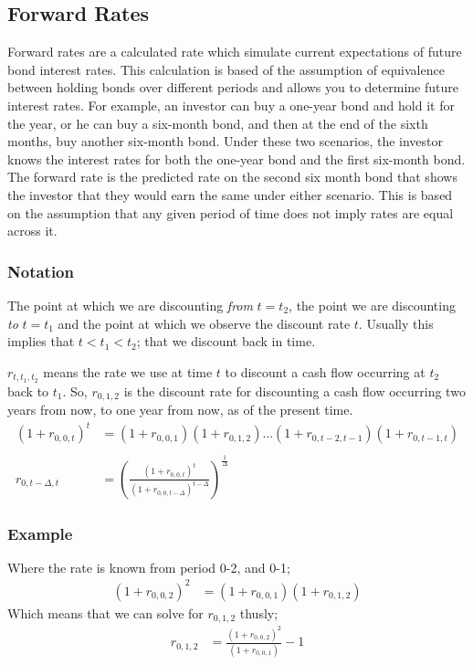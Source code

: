 \documentclass[a4paper]{article}
\begin{document}
\subsection{Forward Rates}
Forward rates are a calculated rate which simulate current expectations of future
bond interest rates. This calculation is based of the assumption of
equivalence between holding bonds over different periods and allows you to
determine future interest rates. For example, an 
investor can buy a one-year bond and hold it for the year, or he can buy a
six-month bond, and then at the end of the sixth months, buy another six-month
bond. Under these two scenarios, the investor knows the interest rates for
both the one-year bond and the first six-month bond. The forward rate is the
predicted rate on the second six month bond that shows the investor that
they would earn the same under either scenario. This is based on the assumption
that any given period of time does not imply rates are equal across it.

\subsubsection{Notation}
The point at which we are discounting \emph{from} $t = t_2$, the point
we are discounting \emph{to} $t = t_1$ and the point at which we observe the
discount rate $t$. Usually this implies that $t < t_1 < t_2$; that we
discount back in time.

$r_{t, t_1, t_2}$ means the rate we use at time $t$ to discount a cash flow
occurring at $t_2$ back to $t_1$. So, $r_{0,1,2}$ is the discount rate for
discounting a cash flow occurring two years from now, to one year from now,
as of the present time.
\begin{align*}
(1 + r_{0,0,t})^t &= (1 + r_{0,0,1})(1 + r_{0,1,2})...(1 + r_{0,t-2,t-1})
(1 + r_{0,t-1,t})\\\\
r_{0,t-\Delta, t} &= \left ( \frac{(1 + r_{0,0,t})^t}
{(1 + r_{0,0,t-\Delta})^{t - \Delta}} \right )^{\frac{1}{\Delta}}
\end{align*}
\subsubsection{Example}
Where the rate is known from period 0-2, and 0-1;
\begin{align*}
(1 + r_{0,0,2})^2 &= (1 + r_{0,0,1})(1 + r_{0,1,2})
\end{align*}
Which means that we can solve for $r_{0,1,2}$ thusly;
\begin{align*}
r_{0,1,2} &= \frac{(1 + r_{0,0,2})^2}{(1 + r_{0,0,1})} - 1
\end{align*}
\end{document}
